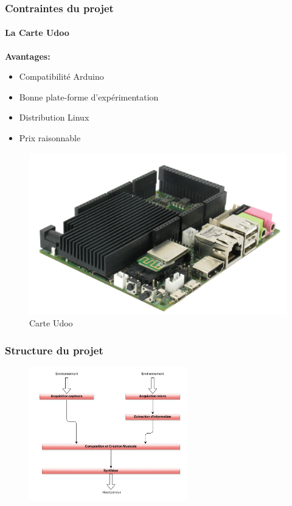 \documentclass{beamer}
\begin{document}
\begin{frame}
\frametitle{Contraintes du projet}
\framesubtitle{La Carte Udoo}
\begin{minipage}{0.49\textwidth}
\textbf{Avantages:}
\begin{itemize}
\item Compatibilité Arduino
\item Bonne plate-forme d’expérimentation
\item Distribution Linux
\item Prix raisonnable
\end{itemize}
\end{minipage}
\begin{minipage}{0.49\textwidth}
\begin{figure}
  \centering
  \includegraphics[width=\textwidth]{udoo.jpg} 
	\caption{Carte Udoo}
\end{figure}
\end{minipage}
\end{frame}

\begin{frame}
\frametitle{Structure du projet}
\begin{figure}
  \centering
  \includegraphics[height=220px]{structprojet.jpg} 
\end{figure}
\end{frame}
\end{document}
